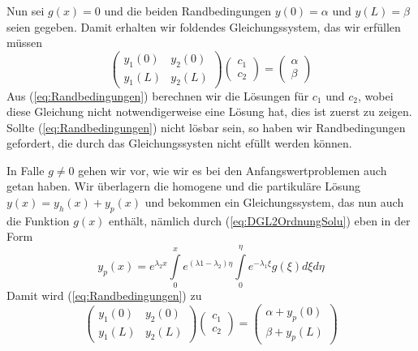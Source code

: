 Nun sei $g(x)=0$ und die beiden Randbedingungen $y(0)=\alpha$ und $y(L)=\beta$ seien gegeben. Damit erhalten wir foldendes Gleichungssystem, das wir erfüllen müssen
\begin{equation}
    \begin{pmatrix}y_1(0)&y_2(0)\\ y_1(L)&y_2(L)\end{pmatrix}
    \begin{pmatrix}c_1\\ c_2\end{pmatrix} = 
     \begin{pmatrix}\alpha \\ \beta\end{pmatrix}
\label{eq:Randbedingungen}
\end{equation}
Aus (\ref{eq:Randbedingungen}) berechnen wir die Lösungen für $c_1$ und $c_2$, wobei diese Gleichung nicht notwendigerweise eine Lösung hat, dies ist zuerst zu zeigen. Sollte (\ref{eq:Randbedingungen}) nicht lösbar sein, so haben wir Randbedingungen gefordert, die durch das Gleichungssysten nicht efüllt werden können.

In Falle $g\ne 0$ gehen wir vor, wie wir es bei den Anfangswertproblemen auch getan haben. Wir überlagern die homogene und die partikuläre Lösung $y(x)=y_h(x)+y_p(x)$ und bekommen ein Gleichungssystem, das nun auch die Funktion $g(x)$ enthält, nämlich durch (\ref{eq:DGL2OrdnungSolu}) eben in der Form
\[ y_p(x)=e^{\lambda_2 x}\int\limits_0^x e^{(\lambda1-\lambda_2)\eta}\int\limits_0^{\eta}e^{-\lambda_1 \xi}g(\xi)d\xi d\eta\]
Damit wird (\ref{eq:Randbedingungen}) zu
\begin{equation}
    \begin{pmatrix}y_1(0)&y_2(0)\\ y_1(L)&y_2(L)\end{pmatrix}
    \begin{pmatrix}c_1\\ c_2\end{pmatrix} = 
     \begin{pmatrix}\alpha+y_p(0) \\ \beta+y_p(L)\end{pmatrix}
\label{eq:RandBDInhom}
\end{equation}
\newpage

